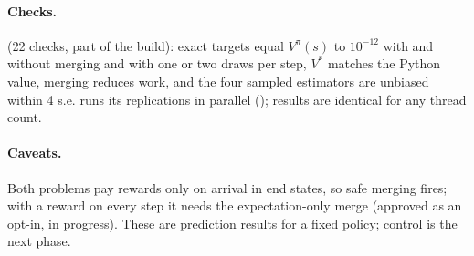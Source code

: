 \paragraph{Checks.}  (22 checks, part of the build): exact targets equal $V^\pi(s)$ to
$10^{-12}$ with and without merging and with one or two draws per step, $V^*$ matches the Python value, merging reduces
work, and the four sampled estimators are unbiased within 4 s.e.  runs its replications in parallel
(); results are identical for any thread count.

\paragraph{Caveats.} Both problems pay rewards only on arrival in end states, so safe merging fires; with a reward on
every step it needs the expectation-only merge (approved as an opt-in, in progress). These are prediction results for a
fixed policy; control is the next phase.
